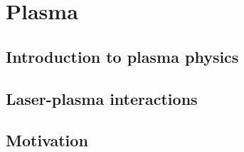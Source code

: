 \chapter{Plasma}
\section{Introduction to plasma physics}
\section{Laser-plasma interactions}
\section{Motivation}